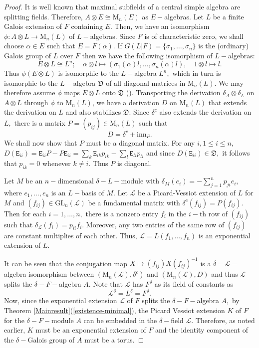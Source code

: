 \documentclass[preprint, 11pt]{amsart}
\theoremstyle{corollary}
\theoremstyle{remark}
\theoremstyle{proposition}
\numberwithin{equation}{subsection}
\begin{document}
\begin{proof}
It is well known that  maximal subfields of a central simple algebra are splitting fields. Therefore, $A\otimes E\cong \mathrm{M}_n(E)$ as $E-$algebras.  Let $L$ be a finite Galois extension of $F$ containing $E.$ Then, we have an isomorphism $\phi: A\otimes L\rightarrow \mathrm{M}_n(L)$ of $L-$algebras. Since $F$ is of characteristic zero, we shall choose $\alpha\in E$ such that $E=F(\alpha).$ If $G(L|F)=\{\sigma_1,\dots, \sigma_n\}$ is the (ordinary) Galois group of $L$ over $F$ then we have the following isomorphism of $L-$algebras: $$E\otimes L\cong L^n;\quad \alpha\otimes l\mapsto (\sigma_1(\alpha)l, \dots, \sigma_n(\alpha)l),\quad 1\otimes l\mapsto l.$$  
 Thus $\phi(E\otimes L)$ is isomorphic to the $L-$algebra $L^n,$ which in turn is isomorphic to the $L-$algebra $\mathfrak{D}$ of all diagonal matrices in $\mathrm{M}_n(L).$  We may therefore assume $\phi$ maps $E\otimes L$ onto $\mathfrak{D}$ (\cite[Lemma 2.2.9]{GSz}).  Transporting  the derivation $\delta_A \otimes \delta_L$ on $A\otimes L$ through $\phi$ to $\mathrm{M}_n(L)$, we have a derivation $D$ on $\mathrm{M}_n(L)$ that extends the derivation on $L$ and also stabilizes $\mathfrak{D}.$ Since $\delta^c$ also extends the derivation on $L,$  there is a matrix $P=(p_{ij})\in \mathrm{M}_n(L)$ such that $$D=\delta^c+\mathrm{inn}_P.$$
 We shall now show that $P$ must be a diagonal matrix.   For any $i, 1\leq i\leq n,$ $D(\mathtt{E}_{ii})=\mathtt{E}_{ii}P-P\mathtt{E}_{ii}=\sum_k \mathtt{E}_{ik}p_{ik}-\sum_l \mathtt{E}_{li}p_{li}$ and since $D(\mathtt{E}_{ii})\in \mathfrak D,$ it follows that $p_{ik}=0$ whenever $k\neq i$. Thus $P$ is diagonal. 
 
 Let $M$ be an $n-$dimensional $\delta-L-$module  with  $\delta_M(e_i)=-\sum^n_{j=1}p_{ji}e_i,$ where $e_1,\dots, e_n$ is an $L-$basis of $M.$ Let  $\mathcal L$ be a Picard-Vessiot extension of $L$ for $M$ and $(f_{ij})\in \mathrm{GL}_n(\mathcal L)$ be a fundamental matrix with  $\delta^c(f_{ij})=P(f_{ij}).$ Then for each $i=1,\dots, n,$ there is a nonzero entry $f_i$ in the $i-$th row of $(f_{ij})$ such that $\delta_\mathcal L(f_i)=p_{ii}f_i.$ Moreover, any two entries of the same row of $(f_{ij})$ are constant multiplies of each other. Thus, $\mathcal L=L(f_1,\dots ,f_n)$ is an exponential extension of $L.$ 
 
 It can be seen that the conjugation map $X\mapsto (f_{ij})X(f_{ij})^{-1}$ is a $\delta-\mathcal L-$algebra isomorphism between $(\mathrm{M}_n(\mathcal L), \delta^c)$ and $(\mathrm{M}_n(\mathcal L), D)$  and thus $\mathcal L$ splits the $\delta-F-$algebra $A.$  Note that  $\mathcal L$ has $F^{\delta}$ as its field of constants as $$\mathcal L^{\delta}=L^{\delta}=F^{\delta}.$$ Now, since the exponential extension $\mathcal L$ of $F$ splits the $\delta-F-$algebra $A,$ by Theorem \ref{Mainresult}(\ref{existence-minimal}),
 the  Picard Vessiot extension $K$ of $F$ for the $\delta-F-$module $A$ can be embedded in the $\delta-$field $\mathcal L.$ Therefore, as noted earlier, $K$ must be an exponential extension of $F$ and the identity component of the $\delta-$Galois group of $A$ must be a torus.\end{proof}
 
\end{document}
